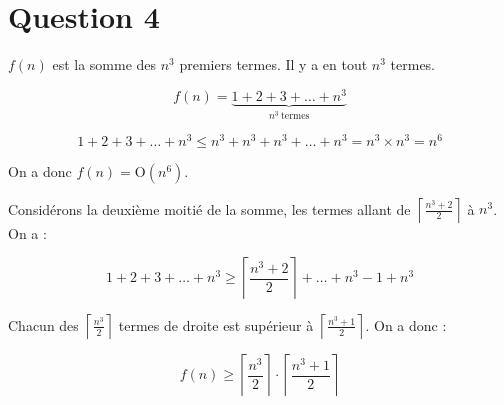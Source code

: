 \section*{Question 4}
$f(n)$ est la somme des $n^3$ premiers termes. Il y a en tout $n^3$ termes.

\[f(n) = \underbrace{1 + 2 + 3 + \dots + n^3}_{n^3\ \text{termes}}\]

\[1 + 2 + 3 + \dots + n^3 \leq n^3 + n^3 + n^3 + \dots + n^3 = n^3 \times n^3 = n^6\]

On a donc $f(n) = \mathrm{O} (n^6)$.

Considérons la deuxième moitié de la somme, les termes allant de $\left\lceil \frac{n^3+2}{2} \right\rceil$ à $n^3$. On a :

\[1 + 2 + 3 + \dots + n^3 \geq \left\lceil\frac{n^3+2}{2}\right\rceil + \dots + n^3 -1 + n^3\]

Chacun des $\left\lceil \frac{n^3}{2} \right\rceil$ termes de droite est supérieur à $\left\lceil\frac{n^3+1}{2}\right\rceil$. On a donc :

\[ f(n) \geq \left\lceil\frac{n^3}{2}\right\rceil \cdot \left\lceil\frac{n^3+1}{2}\right\rceil\]

